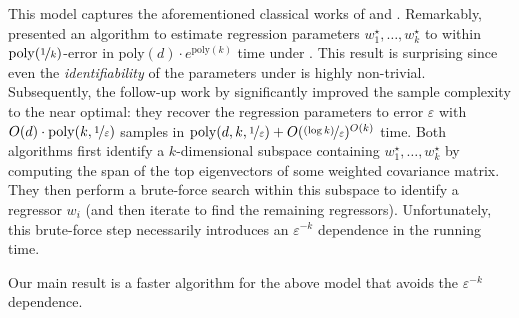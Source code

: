 \documentclass[11pt,letterpaper]{article}
\theoremstyle{plain}
\theoremstyle{definition}
\theoremstyle{remark}
\newcommand{\nfrac}[2]{\nicefrac{#1}{#2}}
\newcommand{\poly}{\mathrm{poly}}
\newcommand{\eps}{\varepsilon}
\begin{document}
    This model captures the aforementioned classical works of \citet{roy1951earnings} and \citet{fair1972methods}.
    Remarkably, \cite{cherapanamjeri2023selfselection} presented an algorithm to estimate regression parameters $w^\star_1,\dots,w^\star_k$ to within $\poly(\nfrac{1}{k})$-error in $\poly(d)\cdot e^{\poly(k)}$ time under .
    This result is surprising since even the \emph{identifiability} of the parameters under  is highly non-trivial.
    Subsequently, the follow-up work by \citet{gaitonde2024selfselection} significantly improved the sample complexity {to the near optimal:} they recover the regression parameters to error $\eps$ with $O(d) \cdot \poly(k, \nfrac{1}{\eps})$ samples in {$\poly(d,k,\nfrac{1}{\eps}) + O(\nfrac{(\log{k})}{\eps})^{O(k)}$} time.
    {Both algorithms first identify a \(k\)-dimensional subspace containing \(w_1^\star, \dots, w_k^\star\) by computing the span of the top eigenvectors of some weighted covariance matrix. They then perform a brute-force search within this subspace to identify a regressor \(w_i\) (and then iterate to find the remaining regressors). Unfortunately, this brute-force step necessarily introduces an \(\eps^{-k}\) dependence in the running time. 
        }
    
    Our main result is a faster algorithm for the above model {that avoids the $\eps^{-k}$ dependence}.  
    
\end{document}
